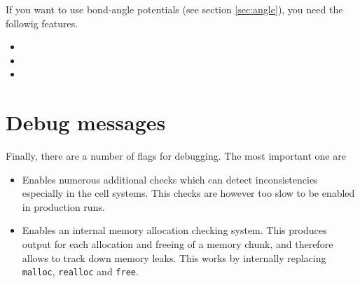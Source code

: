 If you want to use bond-angle potentials (see section
\vref{sec:angle}), you need the followig features.
\begin{itemize}
\item {}
\item {}
\item {}
\end{itemize}

\section{Debug messages}

Finally, there are a number of flags for debugging. The most important
one are
\begin{itemize}
\item {} Enables numerous additional checks
  which can detect inconsistencies especially in the cell systems.
  This checks are however too slow to be enabled in production runs.
\item {} Enables an internal memory allocation
  checking system. This produces output for each allocation and
  freeing of a memory chunk, and therefore allows to track down memory
  leaks. This works by internally replacing \texttt{malloc},
  \texttt{realloc} and \texttt{free}.
\end{itemize}

